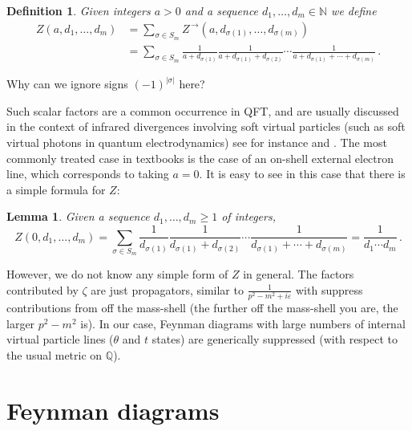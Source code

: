 \documentclass[english,letter paper,12pt,leqno]{article}
\newtheorem{lemma}[theorem]{Lemma}
\theoremstyle{example}
\newtheorem{definition}[theorem]{Definition}
\numberwithin{equation}{section}
\def\be{\begin{equation}}
\def\ee{\end{equation}}
\begin{document}
\begin{definition} Given integers $a > 0$ and a sequence $d_1, \ldots, d_m \in \mathbb{N}$ we define
\begin{align*}
Z(a,d_1,\ldots,d_m) &= \sum_{\sigma \in S_m} Z^{\,\rightarrow}(a,d_{\sigma(1)},\ldots,d_{\sigma(m)})\\
&= \sum_{\sigma \in S_m} \frac{1}{a + d_{\sigma(1)}} \frac{1}{a + d_{\sigma(1)} + d_{\sigma(2)}} \cdots \frac{1}{a + d_{\sigma(1)} + \cdots + d_{\sigma(m)}}\,.
\end{align*}
\end{definition}

Why can we ignore signs $(-1)^{|\sigma|}$ here?

Such scalar factors are a common occurrence in QFT, and are usually discussed in the context of infrared divergences involving soft virtual particles (such as soft virtual photons in quantum electrodynamics) see for instance \cite[Ch. 13]{weinberg} and \cite[p.204]{ps}. The most commonly treated case in textbooks is the case of an on-shell external electron line, which corresponds to taking $a = 0$. It is easy to see in this case that there is a simple formula for $Z$:

\begin{lemma} Given a sequence $d_1,\ldots,d_m \ge 1$ of integers,
\be
Z(0,d_1,\ldots,d_m) = \sum_{\sigma \in S_m} \frac{1}{d_{\sigma(1)}} \frac{1}{d_{\sigma(1)} + d_{\sigma(2)}} \cdots \frac{1}{d_{\sigma(1)} + \cdots + d_{\sigma(m)}} = \frac{1}{d_1 \cdots d_m}\,.
\ee
\end{lemma}

However, we do not know any simple form of $Z$ in general. The factors contributed by $\zeta$ are just propagators, similar to $\frac{1}{p^2 - m^2 + i \varepsilon}$ with suppress contributions from off the mass-shell (the further off the mass-shell you are, the larger $p^2-m^2$ is). In our case, Feynman diagrams with large numbers of internal virtual particle lines ($\theta$ and $t$ states) are generically suppressed (with respect to the usual metric on $\mathbb{Q}$).

\section{Feynman diagrams}\label{section:feynman_diagram}
\end{document}
